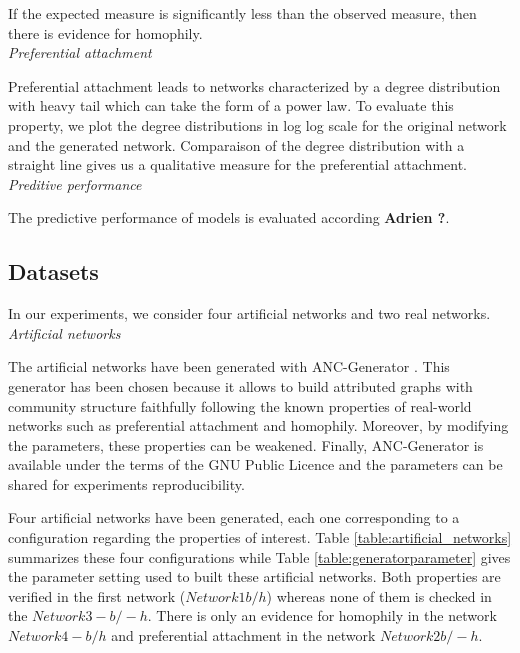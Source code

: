 If the expected measure is significantly less than the observed measure, then there is evidence for homophily.\\

\textit{Preferential attachment}

Preferential attachment leads to networks characterized by a degree distribution with heavy tail which can take the form of a power law. To evaluate this property, we  plot the degree distributions in log log scale for the original network and the generated network. Comparaison of the degree distribution with a straight line gives us a qualitative measure for the preferential attachment.\\

\textit{Preditive performance}

The predictive performance of models is evaluated according \textbf{Adrien ?}.\\

\subsection{Datasets}
In our experiments, we consider four artificial networks and two real networks.\\

\textit{Artificial networks}

The artificial networks have been generated with ANC-Generator \cite{largeron2015}. This generator has been chosen because it allows to build attributed graphs with community structure faithfully following the known properties of real-world networks such as preferential attachment and homophily. 
Moreover, by modifying the parameters, these properties can be weakened. Finally, ANC-Generator is available under the terms of the GNU Public Licence and the parameters can be shared for experiments reproducibility. 

Four artificial networks have been generated, each one corresponding to a configuration  regarding the properties of interest.
Table \ref{table:artificial_networks} summarizes these four configurations while Table \ref{table:generatorparameter} gives the parameter setting used to built these artificial networks. Both properties are verified in the first network ($Network1 b/h$) whereas none of them is checked in the $Network3 -b/-h$.  There is only an evidence for homophily in the network $Network4 -b/h$ and  preferential attachment in the network  $Network2 b/-h$.\\ 


